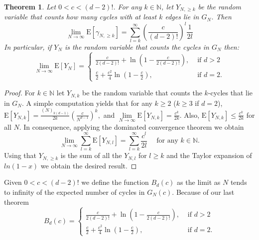 \documentclass[11pt,notitlepage,a4paper]{article}
\newtheorem{theorem}{Theorem}[section]
\theoremstyle{definition}
\newcommand{\N}{\mathbb{N}}
\newcommand{\LN}{\lim\limits_{N\to \infty}}
\begin{document}
	\begin{theorem} \label{thm:expectedcycles}
		Let $0< c< (d-2)!$. For any $k\in \N$, 
		let  $Y_{N,\geq k}$ be the random variable that counts how many 
		cycles with at least $k$ edges lie in $G_N$. Then
		\[
		\LN \mathrm{E}[\gamma_{N,\geq k}]=\sum_{l=k}^{\infty} 
		\left(\frac{c}{(d-2)!}\right)^l \frac{1}{2l}
		\] 	
		In particular, if $Y_N$ is the random variable that counts the cycles
		in $G_N$ then:
		\[
		\LN \mathrm{E}[Y_{N}]	= 
		\begin{cases}
		\frac{c}{2(d-2)!}+ \ln\left(1-\frac{c}{2(d-2)!}\right), &  
		\text{ if } d>2\\
		\frac{c}{2}+ \frac{c^2}{4} 
		\ln\left(1-\frac{c}{2}\right), &
		\text{ if } d=2.
		\end{cases}
		\]
	\end{theorem}
	\begin{proof}
		For $k\in \N$ let $Y_{N,k}$ be the random
		variable that counts
		the $k$-cycles that lie in $G_N$.
		A simple computation yields that for 
		any $k\geq 2$ ($k\geq 3$ if $d=2$),
		$
		\mathrm{E}[Y_{N,k}]= \frac{(N)_{k(d-1)}}{2k}
		\left(\frac{c}{N^{d-1}}\right)^k,$
		and
		$
		\LN	\mathrm{E}[Y_{N,k}]= \frac{c^k}{2k}
		$.
		Also,
		$
		\mathrm{E}[Y_{N,k}]\leq \frac{c^k}{2k}$
		for all $N$. In consequence, applying the dominated convergence
		theorem we obtain
		\[ 
		\LN \sum_{l=k}^\infty \mathrm{E}[Y_{N,l}]=
		 \sum_{l=k}^\infty \frac{c^l}{2l} \quad 
		 \text{ for any } k\in \N.
		\]
		Using that $Y_{N,\geq k}$ is the sum of all the $Y_{N,l}$
		for $l\geq k$ and the Taylor expansion of $ln(1-x)$ we obtain
		the desired	result. 
	\end{proof}
	
	Given $0<c<(d-2)!$ we define the function $B_d(c)$ as 
	the limit as $N$ tends to infinity of the expected number of
	cycles in $G_N(c)$. Because of our last theorem
	\[
	B_d(c)=\begin{cases}
	\frac{c}{2(d-2)!}+ \ln\left(1-\frac{c}{2(d-2)!}\right)
	,& \text{ if } d>2\\	
	\frac{c}{2}+ \frac{c^2}{4} \ln\left(1-\frac{c}{2}\right)
	, &\text{ if } d=2.
	\end{cases}
	\]
	
\end{document}
